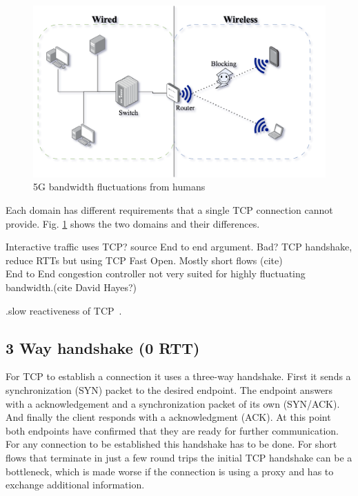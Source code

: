 \documentclass[a4paper,english, 11pt]{report}
\begin{document}
\begin{figure}[h] %
	\centering
	\includegraphics[scale=0.65]{../diagrams/drawio/domains.png}
  	\caption{5G bandwidth fluctuations from humans}
  	\label{fig:domains}
\end{figure}

Each domain has different requirements that a single TCP connection cannot provide. Fig. \ref{fig:domains} shows the two domains and their differences.

Interactive traffic uses TCP? {source}
End to end argument. Bad?
TCP handshake, reduce RTTs but using TCP Fast Open. Mostly short flows (cite)
\\
End to End congestion controller not very suited for highly fluctuating bandwidth.(cite David Hayes?)

.slow reactiveness of TCP~\cite{tcp_mmwave_proxy}.

\subsection{3 Way handshake (0 RTT)}
For TCP to establish a connection it uses a three-way handshake. First it sends a synchronization (SYN) packet to the desired endpoint. The endpoint answers with a acknowledgement and a synchronization packet of its own (SYN/ACK). And finally the client responds with a acknowledgment (ACK). At this point both endpoints have confirmed that they are ready for further communication. For any connection to be established this handshake has to be done. For short flows that terminate in just a few round trips the initial TCP handshake can be a bottleneck, which is made worse if the connection is using a proxy and has to exchange additional information. 
\end{document}
